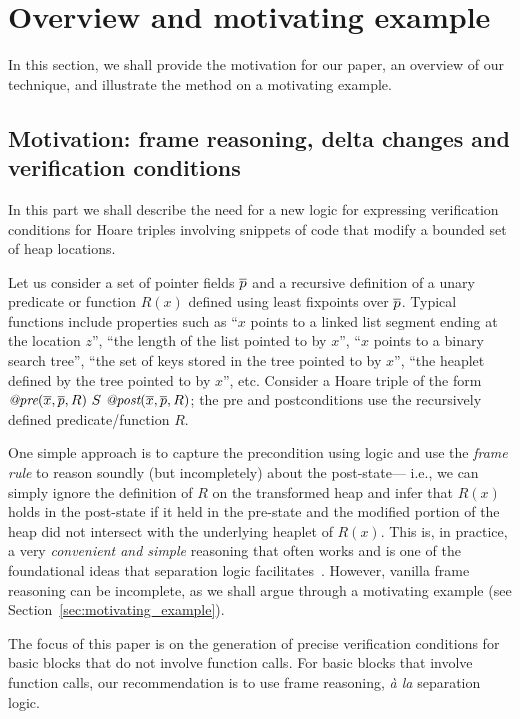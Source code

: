 \section{Overview and motivating example}
\label{sec:motivation}

In this section, we shall provide the motivation for our paper, an overview of our technique, and illustrate the method on a motivating example.

\subsection{Motivation: frame reasoning, delta changes and verification conditions}
In this part we shall describe the need for a new logic for expressing verification conditions for Hoare triples involving snippets of code that modify a bounded set of heap locations.

Let us consider a set of pointer fields $\overline{p}$ and a recursive definition of a unary predicate or function $R(x)$ defined
using least fixpoints over $\overline{p}$. Typical functions include properties such as 
``$x$ points to a linked list segment ending at the location $z$'', ``the length of the list pointed to by $x$'', 
``$x$ points to a binary search tree'', ``the set of keys stored in the tree pointed to by $x$'', ``the heaplet defined
by the tree pointed to by $x$'', etc.
Consider a Hoare triple of the form $\textit{@pre}(\overline{x}, \overline{p}, R) ~S~ \textit{@post}(\overline{x}, \overline{p}, R)$; the pre and postconditions use the recursively defined predicate/function $R$.

One simple approach is to capture the precondition using logic and use the \emph{frame rule} to reason soundly
(but incompletely) about the post-state--- i.e., we can simply ignore the definition of $R$
on the transformed heap and infer that $R(x)$ holds in the post-state if it held in the pre-state and 
the modified portion of the heap did not intersect with the underlying heaplet of $R(x)$.
This is, in practice, a very \emph{convenient and simple} reasoning that often works and is one of the foundational ideas that separation logic facilitates~\cite{Reynolds2002}. However, vanilla frame reasoning can be incomplete, as we shall argue through a motivating example (see Section~\ref{sec:motivating_example}). 

The focus of this paper is on the generation of precise verification conditions for basic blocks that do not involve function calls. For basic blocks that involve function calls, our recommendation is to use frame reasoning, \emph{\`a la} separation logic. 

